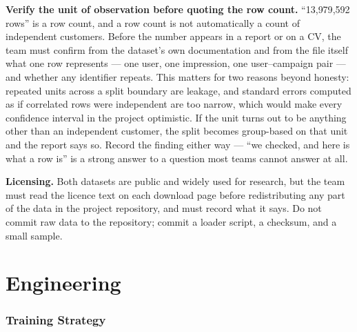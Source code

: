 \documentclass[11pt,a4paper]{article}
\begin{document}
\begin{alertbox}
\textbf{Verify the unit of observation before quoting the row count.} ``13{,}979{,}592 rows'' is a
row count, and a row count is not automatically a count of independent customers. Before the number
appears in a report or on a CV, the team must confirm from the dataset's own documentation and from
the file itself what one row represents --- one user, one impression, one user--campaign pair --- and
whether any identifier repeats. This matters for two reasons beyond honesty: repeated units across a
split boundary are leakage, and standard errors computed as if correlated rows were independent are
too narrow, which would make every confidence interval in the project optimistic. If the unit turns
out to be anything other than an independent customer, the split becomes group-based on that unit
and the report says so. Record the finding either way --- ``we checked, and here is what a row is''
is a strong answer to a question most teams cannot answer at all.
\end{alertbox}

\begin{keybox}
\textbf{Licensing.} Both datasets are public and widely used for research, but the team must read
the licence text on each download page before redistributing any part of the data in the project
repository, and must record what it says. Do not commit raw data to the repository; commit a
loader script, a checksum, and a small sample.
\end{keybox}
\part{Engineering}

\section{Training Strategy}
\end{document}
